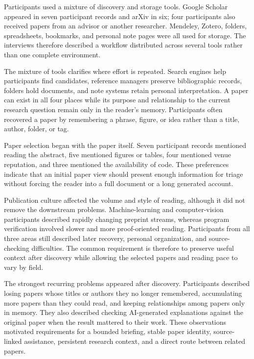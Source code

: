Participants used a mixture of discovery and storage tools.  Google Scholar
appeared in seven participant records and arXiv in six; four participants also
received papers from an advisor or another researcher.  Mendeley, Zotero,
folders, spreadsheets, bookmarks, and personal note pages were all used for
storage.  The interviews therefore described a workflow distributed across
several tools rather than one complete environment.

The mixture of tools clarifies where effort is repeated.  Search engines help
participants find candidates, reference managers preserve bibliographic
records, folders hold documents, and note systems retain personal
interpretation.  A paper can exist in all four places while its purpose and
relationship to the current research question remain only in the reader's
memory.  Participants often recovered a paper by remembering a phrase, figure,
or idea rather than a title, author, folder, or tag.

Paper selection began with the paper itself.  Seven participant records
mentioned reading the abstract, five mentioned figures or tables, four
mentioned venue reputation, and three mentioned the availability of code.
These preferences indicate that an initial paper view should present enough
information for triage without forcing the reader into a full document or a
long generated account.

Publication culture affected the volume and style of reading, although it did
not remove the downstream problems.  Machine-learning and computer-vision
participants described rapidly changing preprint streams, whereas program
verification involved slower and more proof-oriented reading.  Participants
from all three areas still described later recovery, personal organization,
and source-checking difficulties.  The common requirement is therefore to
preserve useful context after discovery while allowing the selected papers and
reading pace to vary by field.

The strongest recurring problems appeared after discovery.  Participants
described losing papers whose titles or authors they no longer remembered,
accumulating more papers than they could read, and keeping relationships among
papers only in memory.  They also described checking AI-generated explanations
against the original paper when the result mattered to their work.  These
observations motivated requirements for a bounded briefing, stable paper
identity, source-linked assistance, persistent research context, and a direct
route between related papers.

